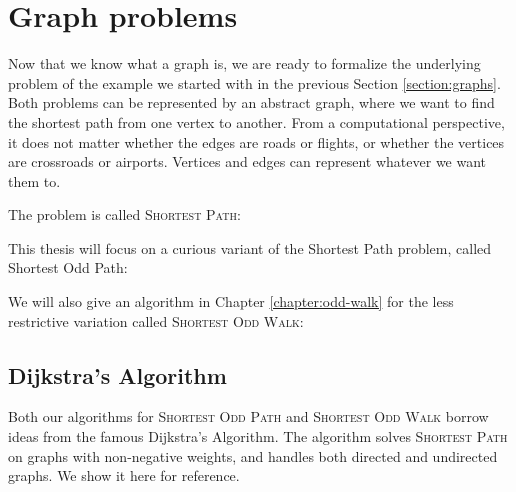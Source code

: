 \section{Graph problems}
\label{section:graph-problems}

Now that we know what a graph is, we are ready to formalize the underlying problem of the example we started with in the previous Section \ref{section:graphs}. Both problems can be represented by an abstract graph, where we want to find the shortest path from one vertex to another. From a computational perspective, it does not matter whether the edges are roads or flights, or whether the vertices are crossroads or airports. Vertices and edges can represent whatever we want them to. 

The problem is called \textsc{Shortest Path}:

\noindent{}

This thesis will focus on a curious variant of the Shortest Path problem, called Shortest Odd Path:

\noindent{}

We will also give an algorithm in Chapter \ref{chapter:odd-walk} for the less restrictive variation called \textsc{Shortest Odd Walk}:

\noindent{}

\subsection{Dijkstra's Algorithm}
\label{algorithm:dijkstras-algorithm}
Both our algorithms for \textsc{Shortest Odd Path} and \textsc{Shortest Odd Walk} borrow ideas from the famous Dijkstra's Algorithm. The algorithm solves \textsc{Shortest Path} on graphs with non-negative weights, and handles both directed and undirected graphs. We show it here for reference.

